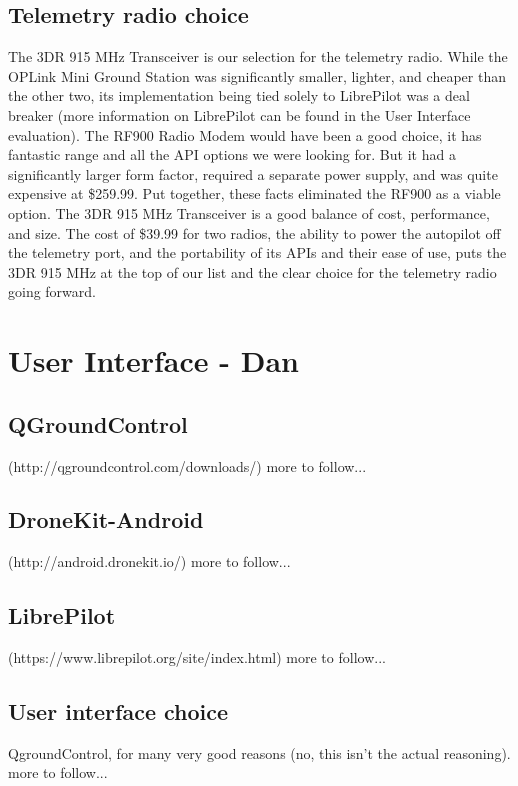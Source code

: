 \documentclass[compsoc,draftclsnofoot,onecolumn,10pt]{IEEEtran}
\begin{document}
\subsection{Telemetry radio choice}
The 3DR 915 MHz Transceiver is our selection for the telemetry radio.
While the OPLink Mini Ground Station was significantly smaller, lighter, and
cheaper than the other two, its implementation being tied solely to LibrePilot
was a deal breaker (more information on LibrePilot can be found in the User
Interface evaluation).
The RF900 Radio Modem would have been a good choice, it has fantastic range
and all the API options we were looking for. But it had a significantly larger
form factor, required a separate power supply, and was quite expensive at
\$259.99. Put together, these facts eliminated the RF900 as a viable option.
The 3DR 915 MHz Transceiver is a good balance of cost, performance, and size. The
cost of \$39.99 for two radios, the ability to power the autopilot off the
telemetry port, and the portability of its APIs and their ease of use, puts the
3DR 915 MHz at the top of our list and the clear choice for the telemetry
radio going forward.

\section{User Interface - Dan}

\subsection{QGroundControl}
(http://qgroundcontrol.com/downloads/)
more to follow...

\subsection{DroneKit-Android}
(http://android.dronekit.io/)
more to follow...

\subsection{LibrePilot}
(https://www.librepilot.org/site/index.html)
more to follow...

\subsection{User interface choice}
QgroundControl, for many very good reasons (no, this isn't the actual reasoning).
more to follow...
\end{document}
